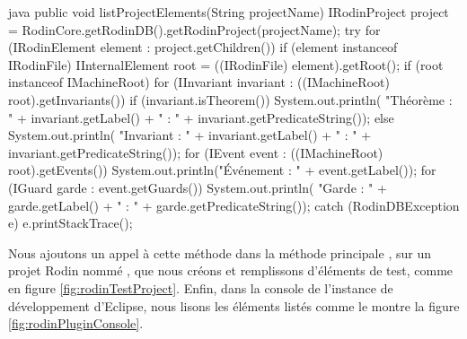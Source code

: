 \begin{imtaCode}{java}
public void listProjectElements(String projectName)
{
    IRodinProject project = RodinCore.getRodinDB().getRodinProject(projectName);
        try
        {
            for (IRodinElement element : project.getChildren())
            {
                if (element instanceof IRodinFile)
                {
                    IInternalElement root = ((IRodinFile) element).getRoot();
                    if (root instanceof IMachineRoot)
                    {
                        for (IInvariant invariant : 
                             ((IMachineRoot) root).getInvariants())
                        {
                            if (invariant.isTheorem())
                            {
                                System.out.println(
                                    "Théorème : " + invariant.getLabel() + " : "
                                    + invariant.getPredicateString());
                            }
                            else
                            {
                                System.out.println(
                                    "Invariant : " + invariant.getLabel() + " : "
                                    + invariant.getPredicateString());
                            }
                        }
                        for (IEvent event : ((IMachineRoot) root).getEvents())
                        {
                            System.out.println("Événement : " + event.getLabel());
                            for (IGuard garde : event.getGuards())
                            {
                                System.out.println(
                                    "Garde : " + garde.getLabel() + " : " 
                                    + garde.getPredicateString());
                            }
                        }
                    }
                }
            }
        } catch (RodinDBException e) {
        e.printStackTrace();
    }
}
\end{imtaCode}

Nous ajoutons un appel à cette méthode dans la méthode principale , sur un projet Rodin nommé , %
que nous créons et remplissons d'éléments de test, comme en figure \ref{fig:rodinTestProject}.
Enfin, dans la console de l'instance de développement d'Eclipse, nous lisons les éléments listés comme le montre la figure \ref{fig:rodinPluginConsole}.


